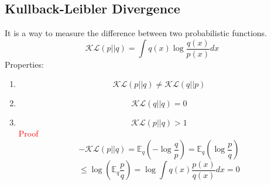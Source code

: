 \documentclass{article}
\begin{document}
\subsection{Kullback-Leibler Divergence} 
It is a way to measure the difference between two probabilistic functions.
\begin{equation}
    \mathcal{K}\mathcal{L}(p || q) = \int q(x) \log \frac{q(x)}{p(x)} dx
\end{equation}
Properties: \begin{enumerate}
    \item \begin{equation}
        \mathcal{K}\mathcal{L}(p || q) \neq \mathcal{K}\mathcal{L}(q || p)
    \end{equation}
    \item \begin{equation}
        \mathcal{K}\mathcal{L}(q || q) = 0
    \end{equation}
    \item \begin{equation}
        \mathcal{K}\mathcal{L}(p || q) > 1
    \end{equation}
\textcolor{red}{Proof}
\begin{equation}
    - \mathcal{K}\mathcal{L}(p || q) = \mathbb{E}_q \left(-\log \frac{q}{p} \right) = \mathbb{E}_q \left(\log \frac{p}{q} \right)
\end{equation}
\begin{equation}
    \leq \log \left(\mathbb{E}_q \frac{p}{q} \right) = \log \int q(x) \frac{p(x)}{q(x)}dx = 0
\end{equation}
\end{enumerate}
\end{document}

